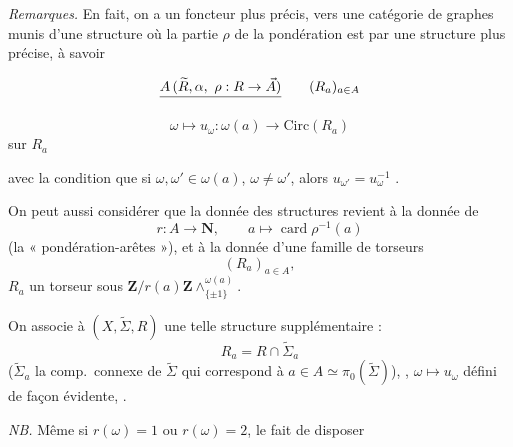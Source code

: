 \documentclass[11pt,a4paper]{article}
\begin{document}
\emph{Remarques.} En fait, on a un foncteur plus précis, vers une catégorie
de graphes munis d'une structure où la partie $\rho$ de la pondération est
\struck{\ill{}} \add{\ill{}} par une structure plus précise, à savoir
 

\[
\struck{A\,(\widetilde{R}, \alpha,\ \rho : R \to \vec{A})}\qquad (R_a)_{a \in A}
\]



\[
\omega \mapsto u_{\omega} : \omega(a) \longrightarrow \mathrm{Circ}(R_a)
\]
\ill{}  sur $R_a$

avec la condition que si $\omega, \omega' \in \omega(a)$, $\omega \neq
\omega'$, alors $u_{\omega'} = u_{\omega}^{-1}$
.

On peut aussi considérer que la donnée des structures revient à la donnée de
\[
r : A \to \mathbf{N}, \qquad a \mapsto \operatorname{card} \rho^{-1}(a)
\]
(la « pondération-arêtes »), et à la donnée d'une famille de torseurs
\[
(R_a)_{a \in A},
\]
$R_a$ un torseur sous
$\mathbf{Z}/r(a)\mathbf{Z} \wedge^{\omega(a)}_{\lbrace \pm 1 \rbrace}$.

On associe à $(X, \widetilde{\Sigma}, R)$ une telle structure
supplémentaire :
\[
R_a = R \cap \widetilde{\Sigma}_a
\]
($\widetilde{\Sigma}_a$ la comp.\ connexe de $\widetilde{\Sigma}$ qui
correspond à $a \in A \simeq \pi_0(\widetilde{\Sigma})$),
, $\omega
\mapsto u_{\omega}$ défini de façon évidente,
.

\emph{NB.} Même si $r(\omega) = 1$ ou $r(\omega) = 2$, le fait de disposer
\end{document}
